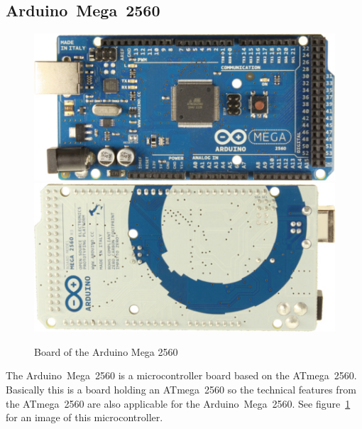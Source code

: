 \subsection{Arduino~Mega~2560} \label {sec:arduinoMega2560}
\begin{figure}
\includegraphics[scale=0.5]{picturesArduino/arduinoMega2560_R3_Front.jpg}
\includegraphics[scale=0.5]{picturesArduino/arduinoMega2560_R3_Back.jpg}
\caption{Board of the Arduino Mega 2560}
\label{fig:mega2560}
\end{figure}

The Arduino~Mega~2560 is a microcontroller board based on the ATmega~2560.
Basically this is a board holding an ATmega~2560 so the technical features from the ATmega~2560 are also applicable for the Arduino~Mega~2560.
See figure~\ref{fig:mega2560} for an image of this microcontroller.



